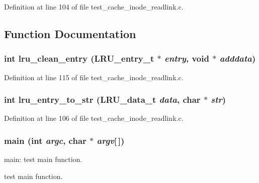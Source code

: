 Definition at line 104 of file test\_\-cache\_\-inode\_\-readlink.c.

\subsection{Function Documentation}
\subsubsection[{lru\_\-clean\_\-entry}]{\setlength{\rightskip}{0pt plus 5cm}int lru\_\-clean\_\-entry (LRU\_\-entry\_\-t $\ast$ {\em entry}, \/  void $\ast$ {\em adddata})}\label{test__cache__inode__readlink_8c_27ecbab481a3103e078489a212a52e3f}




Definition at line 115 of file test\_\-cache\_\-inode\_\-readlink.c.
\subsubsection[{lru\_\-entry\_\-to\_\-str}]{\setlength{\rightskip}{0pt plus 5cm}int lru\_\-entry\_\-to\_\-str (LRU\_\-data\_\-t {\em data}, \/  char $\ast$ {\em str})}\label{test__cache__inode__readlink_8c_d3e6e5506644e1986e6475939863ad3e}




Definition at line 106 of file test\_\-cache\_\-inode\_\-readlink.c.
\subsubsection[{main}]{\setlength{\rightskip}{0pt plus 5cm}main (int {\em argc}, \/  char $\ast$ {\em argv}[$\,$])}\label{test__cache__inode__readlink_8c_e0665038b72011f5c680c660fcb59459}


main: test main function.

test main function.

